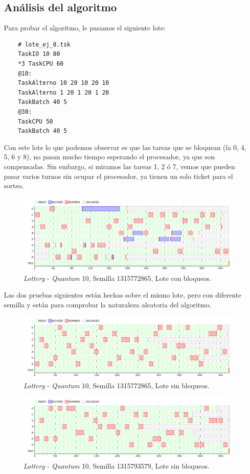 \subsection{Análisis del algoritmo}
Para probar el algoritmo, le pasamos el siguiente lote:
\begin{verbatim}
	# lote_ej_8.tsk
	TaskIO 10 80
	*3 TaskCPU 60
	@10:
	TaskAlterno 10 20 10 20 10
	TaskAlterno 1 20 1 20 1 20
	TaskBatch 40 5
	@30:
	TaskCPU 50
	TaskBatch 40 5
\end{verbatim}

Con este lote lo que podemos observar es que las tareas que se bloquean (la 0, 4, 5, 6 y 8), no pasan mucho tiempo esperando el procesador, ya que son compensadas. Sin embargo, si miramos las tareas 1, 2 ó 7, vemos que pueden pasar varios turnos sin ocupar el procesador, ya tienen un solo ticket para el sorteo.

\begin{figure}[H]
\centering
\includegraphics[scale=0.5]{./graficos/out_ej_8.png}
\caption{\emph{Lottery} - \emph{Quantum} 10, Semilla 1315772865, Lote con bloqueos.}
\end{figure} 

Las dos pruebas siguientes están hechas sobre el mismo lote, pero con diferente semilla y están para comprobar la naturaleza aleatoria del algoritmo.

\begin{figure}[H]
\centering
\includegraphics[scale=0.5]{./graficos/out_ej_8_2.png}
\caption{\emph{Lottery} - \emph{Quantum} 10, Semilla 1315772865, Lote sin bloqueos.}
\end{figure} 

\begin{figure}[H]
\centering
\includegraphics[scale=0.5]{./graficos/out_ej_8_3.png}
\caption{\emph{Lottery} - \emph{Quantum} 10, Semilla 1315793579, Lote sin bloqueos.}
\end{figure} 

